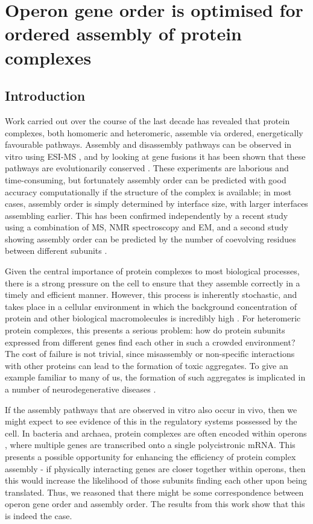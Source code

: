 \documentclass[a4paper,11pt,twoside,openright]{scrbook}
\begin{document}
\chapter{Operon gene order is optimised for ordered assembly of protein complexes}\label{chapter:operons}

\section{Introduction}
Work carried out over the course of the last decade has revealed that protein
complexes, both homomeric and heteromeric, assemble via ordered, energetically
favourable pathways. Assembly and disassembly pathways can be observed in vitro
using ESI-MS \cite{Hernandez2007}, and by looking at gene fusions it has been
shown that these pathways are evolutionarily conserved
\cite{Levy2008,Marsh2013}. These experiments are laborious and time-consuming,
but fortunately assembly order can be predicted with good accuracy
computationally if the structure of the complex is available; in most cases,
assembly order is simply determined by interface size, with larger interfaces
assembling earlier. This has been confirmed independently by a recent study
using a combination of MS, NMR spectroscopy and EM, and a second study showing
assembly order can be predicted by the number of coevolving residues between
different subunits \cite{Macek2017,Mallik2017}.

Given the central importance of protein complexes to most biological processes,
there is a strong pressure on the cell to ensure that they assemble correctly in
a timely and efficient manner. However, this process is inherently stochastic,
and takes place in a cellular environment in which the background concentration
of protein and other biological macromolecules is incredibly high
\cite{Swain2002}. For heteromeric protein complexes, this presents a serious
problem: how do protein subunits expressed from different genes find each other
in such a crowded environment? The cost of failure is not trivial, since
misassembly or non-specific interactions with other proteins can lead to the
formation of toxic aggregates. To give an example familiar to many of us, the
formation of such aggregates is implicated in a number of neurodegenerative
diseases \cite{Ross2004a}.

If the assembly pathways that are observed in vitro also occur in vivo, then we
might expect to see evidence of this in the regulatory systems possessed by the
cell. In bacteria and archaea, protein complexes are often encoded within
operons \cite{Mushegian1996,Dandekar1998}, where multiple genes are transcribed
onto a single polycistronic mRNA. This presents a possible opportunity for
enhancing the efficiency of protein complex assembly - if physically interacting
genes are closer together within operons, then this would increase the
likelihood of those subunits finding each other upon being translated. Thus, we
reasoned that there might be some correspondence between operon gene order and
assembly order. The results from this work show that this is indeed the case.
\end{document}
